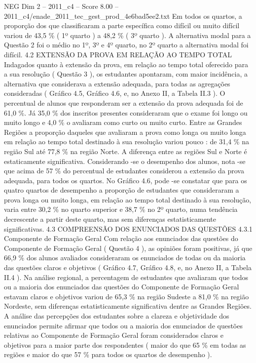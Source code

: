 \begin{textsample}{NEG Dim 2 – 2011\_c4 – Score 8.00 – 2011\_c4/enade\_2011\_tec\_gest\_prod\_4e6bad5ee2.txt}
Em todos os quartos, a proporção dos que classificaram a parte específica como difícil ou muito difícil variou de 43,5 \% ( 1º quarto ) a 48,2 \% ( 3º quarto ).
A alternativa modal para a Questão 2 foi o médio no 1º, 3º e 4º quarto, no 2º quarto a alternativa modal foi difícil. 4.2 EXTENSÃO DA PROVA EM RELAÇÃO AO TEMPO TOTAL Indagados quanto à extensão da prova, em relação ao tempo total oferecido para a sua resolução ( Questão 3 ), os estudantes apontaram, com maior incidência, a alternativa que considerava a extensão adequada, para todas as agregações consideradas ( Gráfico 4.5, Gráfico 4.6, e, no Anexo II, a Tabela II.3 ).
O percentual de alunos que responderam ser a extensão da prova adequada foi de 61,0 \%.
Já 35,0 \% dos inscritos presentes consideraram que o exame foi longo ou muito longo e 4,0 \% o avaliaram como curto ou muito curto.
Entre as Grandes Regiões a proporção daqueles que avaliaram a prova como longa ou muito longa em relação ao tempo total destinado à sua resolução variou pouco : de 31,4 \% na região Sul até 77,8 \% na região Norte.
A diferença entre as regiões Sul e Norte é estaticamente significativa.
Considerando -se o desempenho dos alunos, nota -se que acima de 57 \% do percentual de estudantes considerou a extensão da prova adequada, para todos os quartos.
No Gráfico 4.6, pode -se constatar que para os quatro quartos de desempenho a proporção de estudantes que consideraram a prova longa ou muito longa, em relação ao tempo total destinado à sua resolução, varia entre 30,2 \% no quarto superior e 38,7 \% no 2º quarto, numa tendência decrescente a partir deste quarto, mas sem diferenças estatisticamente significativas. 4.3 COMPREENSÃO DOS ENUNCIADOS DAS QUESTÕES 4.3.1 Componente de Formação Geral Com relação aos enunciados das questões do Componente de Formação Geral ( Questão 4 ), as opiniões foram positivas, já que 66,9 \% dos alunos avaliados consideraram os enunciados de todas ou da maioria das questões claros e objetivos ( Gráfico 4.7, Gráfico 4.8, e, no Anexo II, a Tabela II.4 ).
Na análise regional, a percentagem de estudantes que avaliaram que todos ou a maioria dos enunciados das questões do Componente de Formação Geral estavam claros e objetivos variou de 65,3 \% na região Sudeste a 81,0 \% na região Nordeste, sem diferenças estatisticamente significativa dentre as Grandes Regiões.
A análise das percepções dos estudantes sobre a clareza e objetividade dos enunciados permite afirmar que todos ou a maioria dos enunciados de questões relativas ao Componente de Formação Geral foram considerados claros e objetivos para a maior parte dos respondentes ( maior do que 65 \% em todas as regiões e maior do que 57 \% para todos os quartos de desempenho ).

\end{textsample}
